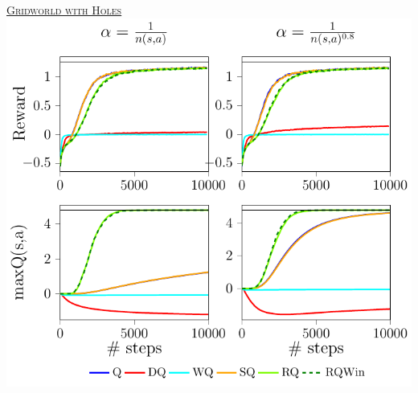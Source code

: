 \documentclass[portrait,a0paper,fontscale=0.312]{baposter}
\newcommand{\listhead}[1] {\textsc{\underline{#1}}}
\newcommand{\compresslist}{%
\setlength{\itemsep}{1pt}%
\setlength{\parskip}{0pt}%
\setlength{\parsep}{0pt}%
}
\begin{document}
\begin{poster}
{\begin{minipage}{0.5\textwidth}
\end{minipage}

\listhead{Gridworld with Holes}\\
{\centering
\includegraphics[scale=0.55]{./imgs/gridHole/grid_hole.pdf}
}
}
% 

% 
% 
% 

%     
%     
  
 
\end{poster}
\end{document}
